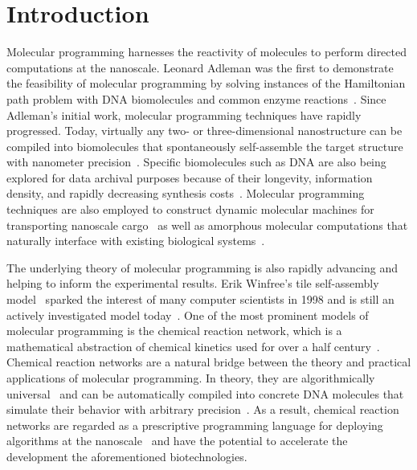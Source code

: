
\section{Introduction}
\label{sec:introduction}
Molecular programming harnesses the reactivity of molecules to perform directed computations at the nanoscale.
Leonard Adleman was the first to demonstrate the feasibility of molecular programming by solving instances of the Hamiltonian path problem with DNA biomolecules and common enzyme reactions~\cite{adleman94}.
Since Adleman's initial work, molecular programming techniques have rapidly progressed.
Today, virtually any two- or three-dimensional nanostructure can be compiled into biomolecules that spontaneously self-assemble the target structure with nanometer precision~\cite{jRoth06,jDDLHGS09,jDMTVCS09,jKOSY12,benson2015dna,Juneaav0655}.
Specific biomolecules such as DNA are also being explored for data archival purposes because of their longevity, information density, and rapidly decreasing synthesis costs~\cite{jChGaKo12,jGBCDLSB13,hughes17}.
Molecular programming techniques are also employed to construct dynamic molecular machines for transporting nanoscale cargo~\cite{jShiPie04,jDoBaCh12,jWoodsQian17} as well as amorphous molecular computations that naturally interface with existing biological systems~\cite{cKiHoWi05,jQiaWin11a,jCDSPCS13}.

The underlying theory of molecular programming is also rapidly advancing and helping to inform the experimental results.
Erik Winfree's tile self-assembly model~\cite{oWinf98,jWeDaYi12,qian17} sparked the interest of many computer scientists in 1998 and is still an actively investigated model today~\cite{jLaLuSu09,cDLPSW10,jMeunier17,cFuSuWe19}.
One of the most prominent models of molecular programming is the chemical reaction network, which is a mathematical abstraction of chemical kinetics used for over a half century~\cite{jAris65}.
Chemical reaction networks are a natural bridge between the theory and practical applications of molecular programming.
In theory, they are algorithmically universal~\cite{jSCWB08,cFLBP17} and can be automatically compiled into concrete DNA molecules that simulate their behavior with arbitrary precision~\cite{cSoSeWi09,jLYCP12,jCard13,jCDSPCS13,jSPSWS17,cBSJDTW17}.
As a result, chemical reaction networks are regarded as a prescriptive programming language for deploying algorithms at the nanoscale~\cite{jSCWB08,cSWBG19,jHKLLL18,rdc} and have the potential to accelerate the development the aforementioned biotechnologies.

